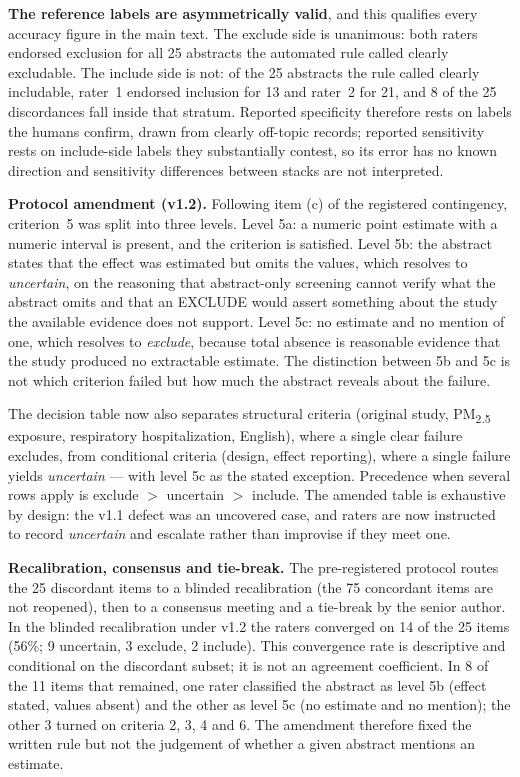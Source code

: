 \documentclass[11pt]{article}
\begin{document}
\textbf{The reference labels are asymmetrically valid}, and this qualifies every accuracy figure in the main text. The exclude side is unanimous: both raters endorsed exclusion for all 25 abstracts the automated rule called clearly excludable. The include side is not: of the 25 abstracts the rule called clearly includable, rater~1 endorsed inclusion for 13 and rater~2 for 21, and 8 of the 25 discordances fall inside that stratum. Reported specificity therefore rests on labels the humans confirm, drawn from clearly off-topic records; reported sensitivity rests on include-side labels they substantially contest, so its error has no known direction and sensitivity differences between stacks are not interpreted.

\textbf{Protocol amendment (v1.2).} Following item (c) of the registered contingency, criterion~5 was split into three levels. Level 5a: a numeric point estimate with a numeric interval is present, and the criterion is satisfied. Level 5b: the abstract states that the effect was estimated but omits the values, which resolves to \emph{uncertain}, on the reasoning that abstract-only screening cannot verify what the abstract omits and that an EXCLUDE would assert something about the study the available evidence does not support. Level 5c: no estimate and no mention of one, which resolves to \emph{exclude}, because total absence is reasonable evidence that the study produced no extractable estimate. The distinction between 5b and 5c is not which criterion failed but how much the abstract reveals about the failure.

The decision table now also separates structural criteria (original study, PM\textsubscript{2.5} exposure, respiratory hospitalization, English), where a single clear failure excludes, from conditional criteria (design, effect reporting), where a single failure yields \emph{uncertain} --- with level 5c as the stated exception. Precedence when several rows apply is exclude $>$ uncertain $>$ include. The amended table is exhaustive by design: the v1.1 defect was an uncovered case, and raters are now instructed to record \emph{uncertain} and escalate rather than improvise if they meet one.

\textbf{Recalibration, consensus and tie-break.} The pre-registered protocol routes the 25 discordant items to a blinded recalibration (the 75 concordant items are not reopened), then to a consensus meeting and a tie-break by the senior author. In the blinded recalibration under v1.2 the raters converged on 14 of the 25 items (56\%; 9 uncertain, 3 exclude, 2 include). This convergence rate is descriptive and conditional on the discordant subset; it is not an agreement coefficient. In 8 of the 11 items that remained, one rater classified the abstract as level 5b (effect stated, values absent) and the other as level 5c (no estimate and no mention); the other 3 turned on criteria 2, 3, 4 and 6. The amendment therefore fixed the written rule but not the judgement of whether a given abstract mentions an estimate.
\end{document}
